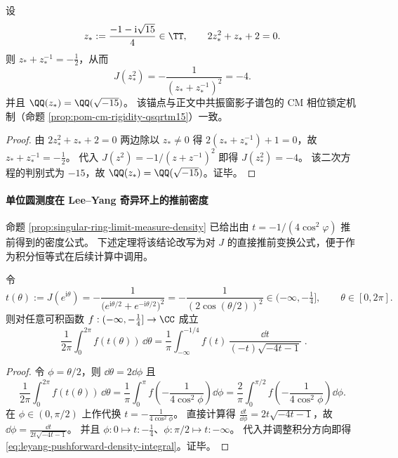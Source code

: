 \begin{corollary}\label{cor:leyang-anchor-minus4-qsqrtm15}
设
\[
z_\ast:=\frac{-1-\mathrm{i}\sqrt{15}}{4}\in\TT,
\qquad
2z_\ast^2+z_\ast+2=0.
\]
则 \(z_\ast+z_\ast^{-1}=-\tfrac12\)，从而
\[
J(z_\ast^2)=-\frac{1}{(z_\ast+z_\ast^{-1})^2}=-4.
\]
并且 \(\QQ(z_\ast)=\QQ(\sqrt{-15})\)。
该锚点与正文中共振窗影子谱包的 CM 相位锁定机制（命题 \ref{prop:pom-cm-rigidity-qsqrtm15}）一致。
\end{corollary}
\begin{proof}
由 \(2z_\ast^2+z_\ast+2=0\) 两边除以 \(z_\ast\neq 0\) 得
\(
2(z_\ast+z_\ast^{-1})+1=0
\)，故 \(z_\ast+z_\ast^{-1}=-\tfrac12\)。
代入 \(J(z^2)=-1/(z+z^{-1})^2\) 即得 \(J(z_\ast^2)=-4\)。
该二次方程的判别式为 \(-15\)，故 \(\QQ(z_\ast)=\QQ(\sqrt{-15})\)。证毕。
\end{proof}

\paragraph{单位圆测度在 Lee--Yang 奇异环上的推前密度}
命题 \ref{prop:singular-ring-limit-measure-density} 已给出由 \(t=-1/(4\cos^2\varphi)\) 推前得到的密度公式。
下述定理将该结论改写为对 \(J\) 的直接推前变换公式，便于作为积分恒等式在后续计算中调用。

\begin{theorem}\label{thm:leyang-pushforward-density-formula}
令
\[
t(\theta):=J(e^{\mathrm{i}\theta})=-\frac{1}{\bigl(e^{\mathrm{i}\theta/2}+e^{-\mathrm{i}\theta/2}\bigr)^2}
=-\frac{1}{(2\cos(\theta/2))^2}\in(-\infty,-\tfrac14],
\qquad \theta\in[0,2\pi].
\]
则对任意可积函数 \(f:(-\infty,-\tfrac14]\to\CC\) 成立
\begin{equation}\label{eq:leyang-pushforward-density-integral}
\boxed{\;
\frac{1}{2\pi}\int_{0}^{2\pi} f(t(\theta))\,\dd\theta
=
\frac{1}{\pi}\int_{-\infty}^{-1/4} f(t)\,\frac{\dd t}{(-t)\sqrt{-4t-1}}\; }.
\end{equation}
\end{theorem}
\begin{proof}
令 \(\phi=\theta/2\)，则 \(\dd\theta=2\dd\phi\) 且
\[
\frac{1}{2\pi}\int_{0}^{2\pi} f(t(\theta))\,\dd\theta
=\frac{1}{\pi}\int_{0}^{\pi} f\!\left(-\frac{1}{4\cos^2\phi}\right)\dd\phi
=\frac{2}{\pi}\int_{0}^{\pi/2} f\!\left(-\frac{1}{4\cos^2\phi}\right)\dd\phi.
\]
在 \(\phi\in(0,\pi/2)\) 上作代换 \(t=-\frac{1}{4\cos^2\phi}\)。
直接计算得
\(
\frac{\dd t}{\dd\phi}=2t\sqrt{-4t-1}
\)，故
\(
\dd\phi=\frac{\dd t}{2t\sqrt{-4t-1}}
\)。
并且 \(\phi:0\mapsto t:-\tfrac14\)、\(\phi:\pi/2\mapsto t:-\infty\)。
代入并调整积分方向即得 \eqref{eq:leyang-pushforward-density-integral}。证毕。
\end{proof}

